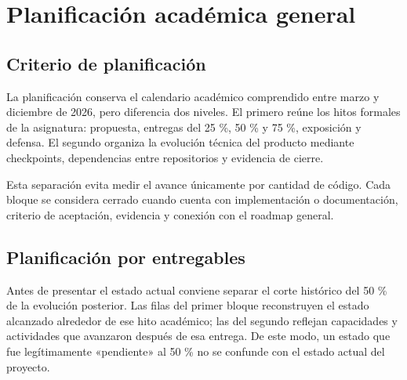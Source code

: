 \chapter{Planificación académica general}
\label{chap:planificacion-academica}

\section{Criterio de planificación}

La planificación conserva el calendario académico comprendido entre marzo y diciembre de 2026, pero diferencia dos niveles. El primero reúne los hitos formales de la asignatura: propuesta, entregas del 25 \%, 50 \% y 75 \%, exposición y defensa. El segundo organiza la evolución técnica del producto mediante checkpoints, dependencias entre repositorios y evidencia de cierre.

Esta separación evita medir el avance únicamente por cantidad de código. Cada bloque se considera cerrado cuando cuenta con implementación o documentación, criterio de aceptación, evidencia y conexión con el roadmap general.

\section{Planificación por entregables}

Antes de presentar el estado actual conviene separar el corte histórico del 50 \% de la evolución posterior. Las filas del primer bloque reconstruyen el estado alcanzado alrededor de ese hito académico; las del segundo reflejan capacidades y actividades que avanzaron después de esa entrega. De este modo, un estado que fue legítimamente «pendiente» al 50 \% no se confunde con el estado actual del proyecto.

